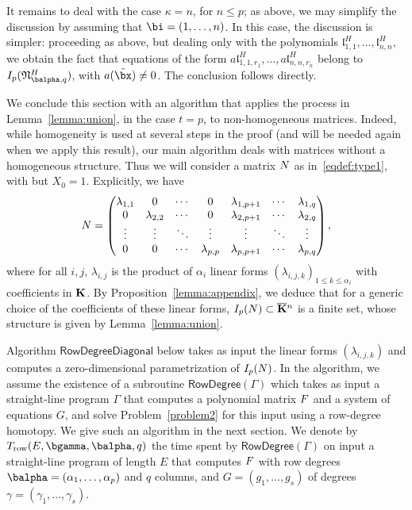 \documentclass[12pt]{article}
\begin{document}
It remains to deal with the case $\kappa=n$, for $n \le p$; as above,
we may simplify the discussion by assuming that $\bi=(1,\dots,n)$. In
this case, the discussion is simpler: proceeding as above, but dealing
only with the polynomials
$\mathfrak{l}^H_{1,1},\dots,\mathfrak{l}^H_{n,n}$, we obtain the fact
that equations of the form $a \mathfrak{l}^H_{1,1,r_1},\dots,a
\mathfrak{l}^H_{n,n,r_n}$ belong to $I_p(\mathfrak{N}^H_{\balpha,q})$,
with $a(\tilde\bx) \ne 0$. The conclusion follows directly.


\medskip

We conclude this section with an algorithm that applies the process
in Lemma~\ref{lemma:union}, in the case $t=p$, to non-homogeneous 
matrices. Indeed, while homogeneity is used at several steps in 
the proof (and will be needed again when we apply this result), our 
main algorithm deals with matrices without a homogeneous structure.
Thus we will consider a matrix ${N}$ as in~\eqref{eqdef:type1},
with but $X_0=1$. Explicitly, we have
\begin{align}\label{eqdef:type1aff}
{N}= \left( \begin{matrix}
\lambda_{1,1} & 0 & \cdots & 0 & \lambda_{1,p+1} & \cdots & \lambda_{1, q}\\
0 & \lambda_{2,2} & \cdots & 0 & \lambda_{2,p+1} & \cdots & \lambda_{2, q}\\
\vdots & \vdots & \ddots & \vdots & \vdots & \ddots & \vdots\\
0 & 0 & \cdots & \lambda_{p,p} & \lambda_{p,p+1} & \cdots & \lambda_{p, q}
\end{matrix} \right),
\end{align}
where for all $i,j$, $\lambda_{i,j}$ is the product of $\alpha_i$
linear forms $(\lambda_{i,j,k})_{1 \le k \le \alpha_i}$ with
coefficients in $\mathbf{K}$.  By Proposition~\ref{lemma:appendix}, we deduce
that for a generic choice of the coefficients of these linear forms,
$I_p({N}) \subset \overline{\mathbf{K}}{}^n$ is a finite set, whose structure is
given by Lemma~\ref{lemma:union}.

Algorithm $\mathsf{RowDegreeDiagonal}$ below takes as input the linear
forms $(\lambda_{i,j,k})$ and computes a zero-dimensional
parametrization of $I_p({N})$. In the algorithm, we assume the
existence of a subroutine $\mathsf{RowDegree}(\Gamma)$ which takes as
input a straight-line program $\Gamma$ that computes a polynomial
matrix ${F}$ and a system of equations $G$, and solve
Problem~\ref{problem2} for this input using a row-degree homotopy. We
give such an algorithm in the next section. We denote by $T_{\rm
  row}(E,\bgamma,\balpha,q)$ the time spent by
$\mathsf{RowDegree}(\Gamma)$ on input a straight-line program of
length $E$ that computes ${F}$ with row degrees
$\balpha=(\alpha_1,\dots,\alpha_p)$ and $q$ columns, and
$G=(g_1,\dots,g_s)$ of degrees $\gamma=(\gamma_1,\dots,\gamma_s)$.
\end{document}
